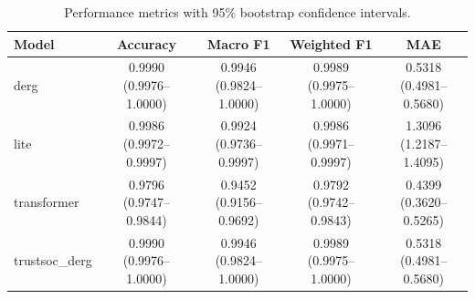 \begin{table}[htbp]
\centering
\caption{Performance metrics with 95\% bootstrap confidence intervals.}
\label{tab:confidence_intervals}
\begin{tabular}{lcccc}
\toprule
\textbf{Model} & \textbf{Accuracy} & \textbf{Macro F1} & \textbf{Weighted F1} & \textbf{MAE} \\
\midrule
derg & 0.9990 (0.9976–1.0000) & 0.9946 (0.9824–1.0000) & 0.9989 (0.9975–1.0000) & 0.5318 (0.4981–0.5680) \\
lite & 0.9986 (0.9972–0.9997) & 0.9924 (0.9736–0.9997) & 0.9986 (0.9971–0.9997) & 1.3096 (1.2187–1.4095) \\
transformer & 0.9796 (0.9747–0.9844) & 0.9452 (0.9156–0.9692) & 0.9792 (0.9742–0.9843) & 0.4399 (0.3620–0.5265) \\
trustsoc_derg & 0.9990 (0.9976–1.0000) & 0.9946 (0.9824–1.0000) & 0.9989 (0.9975–1.0000) & 0.5318 (0.4981–0.5680) \\
\bottomrule
\end{tabular}
\end{table}